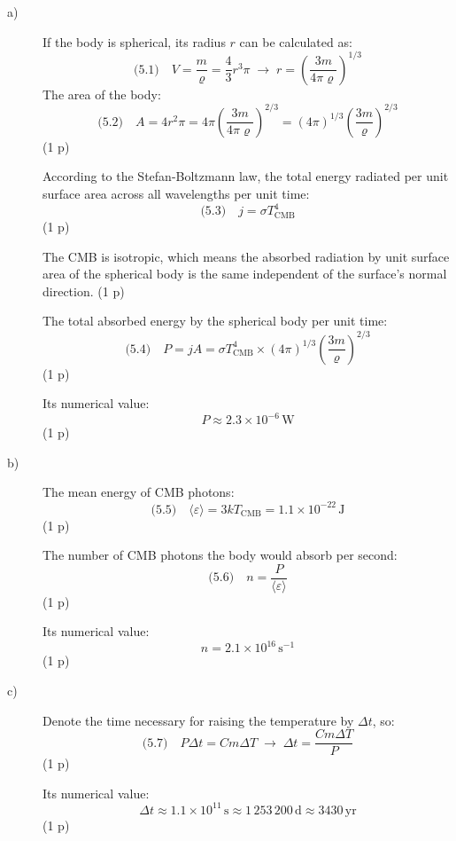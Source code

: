 \begin{description}
\item[a)] If the body is spherical, its radius $r$ can be calculated as:
  \[ \text{(5.1)}\quad V = \frac{m}{\varrho} = \frac{4}{3}r^3\pi
     \;\rightarrow\; r = \left(\frac{3m}{4\pi\varrho}\right)^{1/3} \]
  The area of the body:
  \[ \text{(5.2)}\quad A = 4r^2\pi
     = 4\pi\left(\frac{3m}{4\pi\varrho}\right)^{2/3}
     = (4\pi)^{1/3}\left(\frac{3m}{\varrho}\right)^{2/3} \]
  \hfill(1 p)

  According to the Stefan-Boltzmann law, the total energy radiated per unit
  surface area across all wavelengths per unit time:
  \[ \text{(5.3)}\quad j = \sigma T_{\mathrm{CMB}}^4 \]
  \hfill(1 p)

  The CMB is isotropic, which means the absorbed radiation by unit surface
  area of the spherical body is the same independent of the surface's normal
  direction. \hfill(1 p)

  The total absorbed energy by the spherical body per unit time:
  \[ \text{(5.4)}\quad P = jA = \sigma T_{\mathrm{CMB}}^4
     \times (4\pi)^{1/3}\left(\frac{3m}{\varrho}\right)^{2/3} \]
  \hfill(1 p)

  Its numerical value:
  \[ P \approx \boxed{2.3\times10^{-6}\,\mathrm{W}} \]
  \hfill(1 p)
\item[b)] The mean energy of CMB photons:
  \[ \text{(5.5)}\quad \langle\varepsilon\rangle = 3kT_{\mathrm{CMB}}
     = 1.1\times10^{-22}\,\mathrm{J} \]
  \hfill(1 p)

  The number of CMB photons the body would absorb per second:
  \[ \text{(5.6)}\quad n = \frac{P}{\langle\varepsilon\rangle} \]
  \hfill(1 p)

  Its numerical value:
  \[ n = \boxed{2.1\times10^{16}\,\mathrm{s^{-1}}} \]
  \hfill(1 p)
\item[c)] Denote the time necessary for raising the temperature by
  $\Delta t$, so:
  \[ \text{(5.7)}\quad P\Delta t = Cm\Delta T
     \;\rightarrow\; \Delta t = \frac{Cm\Delta T}{P} \]
  \hfill(1 p)

  Its numerical value:
  \[ \Delta t \approx \boxed{1.1\times10^{11}\,\mathrm{s}}
     \approx 1\,253\,200\,\mathrm{d} \approx \boxed{3430\,\mathrm{yr}} \]
  \hfill(1 p)
\end{description}

